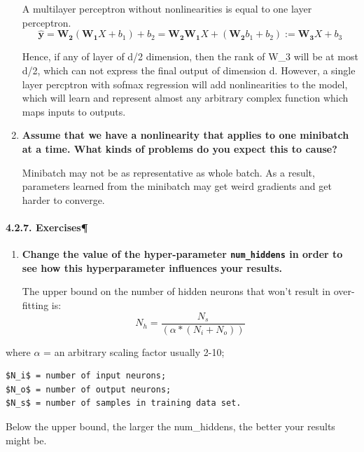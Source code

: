 \documentclass[11pt]{article}
\begin{document}
\begin{enumerate}
  A multilayer perceptron without nonlinearities is equal to one layer
  perceptron.
  \[ {\hat{\mathbf{y}}} = \mathbf{W_2}(\mathbf{W_1}X + b_1) + b_2 = \mathbf{W_2} \mathbf{W_1} X + (\mathbf{W_2} b_1 + b_2) := \mathbf{W_3}X + b_3\]

  Hence, if any of layer of d/2 dimension, then the rank of W\_3 will be
  at most d/2, which can not express the final output of dimension d.
  However, a single layer percptron with sofmax regression will add
  nonlinearities to the model, which will learn and represent almost any
  arbitrary complex function which maps inputs to outputs.
\item
  \textbf{Assume that we have a nonlinearity that applies to one
  minibatch at a time. What kinds of problems do you expect this to
  cause?}

  Minibatch may not be as representative as whole batch. As a result,
  parameters learned from the minibatch may get weird gradients and get
  harder to converge.
\end{enumerate}

    \paragraph{4.2.7. Exercises¶}\label{exercises}

\begin{enumerate}
\def\labelenumi{\arabic{enumi}.}
\item
  \textbf{Change the value of the hyper-parameter \texttt{num\_hiddens}
  in order to see how this hyperparameter influences your results.}

  The upper bound on the number of hidden neurons that won't result in
  over-fitting is: \[N_h = \frac{N_s} {(\alpha * (N_i + N_o))}\]
\end{enumerate}

where \(\alpha\) = an arbitrary scaling factor usually 2-10;

\begin{verbatim}
$N_i$ = number of input neurons; 
$N_o$ = number of output neurons;   
$N_s$ = number of samples in training data set.
\end{verbatim}

Below the upper bound, the larger the num\_hiddens, the better your
results might be.
\end{document}
